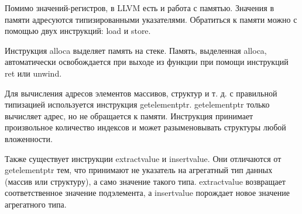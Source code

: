 Помимо значений-регистров, в LLVM есть и работа с памятью.
Значения в памяти адресуются типизированными указателями.
Обратиться к памяти можно с помощью двух инструкций: load и store.

Инструкция alloca выделяет память на стеке.
Память, выделенная alloca, автоматически освобождается при выходе из функции при помощи инструкций ret или unwind.

Для вычисления адресов элементов массивов, структур и т. д. с правильной типизацией используется инструкция getelementptr.
getelementptr только вычисляет адрес, но не обращается к памяти.
Инструкция принимает произвольное количество индексов и может разыменовывать структуры любой вложенности.

Также существует инструкции extractvalue и insertvalue.
Они отличаются от getelementptr тем, что принимают не указатель на агрегатный тип данных (массив или структуру), а само значение такого типа.
extractvalue возвращает соответственное значение подэлемента, а insertvalue порождает новое значение агрегатного типа.


